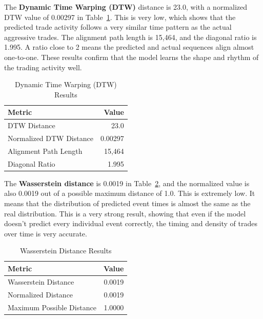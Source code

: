 The \textbf{Dynamic Time Warping (DTW)} distance is 23.0, with a normalized DTW value of 0.00297 in Table~\ref{tab:dtw}. This is very low, which shows that the predicted trade activity follows a very similar time pattern as the actual aggressive trades. The alignment path length is 15,464, and the diagonal ratio is 1.995. A ratio close to 2 means the predicted and actual sequences align almost one-to-one. These results confirm that the model learns the shape and rhythm of the trading activity well.
\begin{table}[H]
    \centering
    \caption{Dynamic Time Warping (DTW) Results} \label{tab:dtw}
    \begin{tabular}{lr}
    \toprule
    Metric & Value \\
    \midrule
    DTW Distance & 23.0 \\
    Normalized DTW Distance & 0.00297 \\
    Alignment Path Length & 15,464 \\
    Diagonal Ratio & 1.995 \\
    \bottomrule
    \end{tabular}
\end{table}

The \textbf{Wasserstein distance} is 0.0019 in Table~\ref{tb:wasserstein-results}, and the normalized value is also 0.0019 out of a possible maximum distance of 1.0. This is extremely low. It means that the distribution of predicted event times is almost the same as the real distribution. This is a very strong result, showing that even if the model doesn't predict every individual event correctly, the timing and density of trades over time is very accurate.
\begin{table}[H]
    \centering
    \caption{Wasserstein Distance Results}
    \label{tb:wasserstein-results}
    \begin{tabular}{lr}
    \toprule
    Metric & Value \\
    \midrule
    Wasserstein Distance & 0.0019 \\
    Normalized Distance & 0.0019 \\
    Maximum Possible Distance & 1.0000 \\
    \bottomrule
    \end{tabular}
\end{table}

